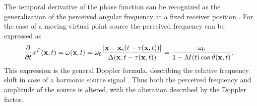The temporal derivative of the phase function can be recognized as the generalization of the perceived angular frequency at a fixed receiver position \cite{Morse1968}.
For the case of a moving virtual point source the perceived frequency can be expressed as 
\begin{equation}
\label{eq:HF_appr:moving_s_per_freq}
\frac{\partial}{\partial t}\phi^P(\mathbf{x},t) =  \omega(\mathbf{x},t) = \omega_0  \frac{|\mathbf{x}-\mathbf{x}_{\mathrm{s}}(t-\tau(\mathbf{x},t))|}{\Delta(\mathbf{x},t-\tau(\mathbf{x},t))} = \frac{  \omega_0  }{1 - M(t) \cos \vartheta(\mathbf{x},t) }.
\end{equation}
This expression is the general Doppler formula, describing the relative frequency shift in case of a harmonic source signal \cite{Morse1968}. 
Thus both the perceived frequency and amplitude of the source is altered, with the alteration described by the Doppler factor.

